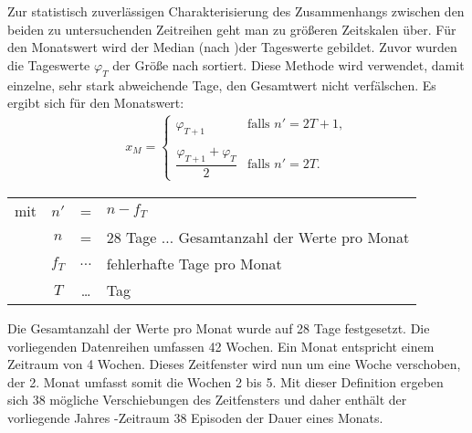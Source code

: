 \documentclass[fontsize=11pt, twoside, a4paper]{scrartcl}
\begin{document}
 Zur statistisch zuverlässigen Charakterisierung des Zusammenhangs zwischen den beiden zu untersuchenden Zeitreihen geht man zu größeren Zeitskalen über. Für den Monatswert wird der Median (nach \cite{TaschenbuchMathematik})der Tageswerte gebildet. Zuvor wurden die Tageswerte $\varphi_{T}$ der Größe nach sortiert.
Diese Methode wird verwendet, damit einzelne, sehr stark abweichende Tage, den Gesamtwert nicht verfälschen. Es ergibt sich für den Monatswert:
\begin{align}
x_{M} = \begin{cases} \varphi_{T+1}& \text{falls $n'=2T+1$},\\
							\nonumber\\
							 \dfrac{\varphi_{T+1}+\varphi_{T}}{2}& \text{falls $n'=2T$}. \end{cases}
\end{align}
\begin{table}[H]
\begin{tabular}{rccl}
mit  & $n'$ & = & $n - f_{T}$\\
	 & $n$ & = & 28 Tage $\ldots$ Gesamtanzahl der Werte pro Monat\\
	 & $f_{T}$ & $\ldots$ & fehlerhafte Tage pro Monat\\
	 & $T$ & \ldots & Tag\\
\end{tabular}
\end{table}
Die Gesamtanzahl der Werte pro Monat wurde auf 28 Tage festgesetzt. Die vorliegenden Datenreihen umfassen 42 Wochen. Ein Monat entspricht einem Zeitraum von 4 Wochen. Dieses Zeitfenster wird nun um eine Woche verschoben, der 2. Monat umfasst somit die Wochen 2 bis 5. Mit dieser Definition ergeben sich 38 mögliche Verschiebungen des Zeitfensters und daher enthält der vorliegende \glqq Jahres \grqq -Zeitraum 38 Episoden der Dauer eines Monats.\\ 
\end{document}
